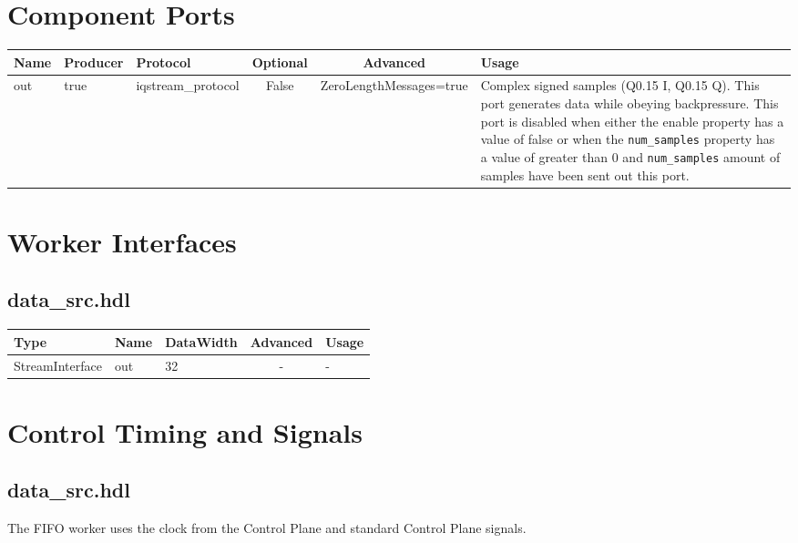 \documentclass{article}
\def\comp{temp}
\def\comp{data\_src}
\begin{document}
\begin{landscape}
	\section*{Component Ports}
	\begin{scriptsize}
\begin{tabular}{|M{2cm}|M{1.5cm}|M{4cm}|c|c|M{9cm}|}
\hline
{}
Name & Producer & Protocol & Optional & Advanced & Usage
\\
\hline
out & true & iqstream\_protocol& False & ZeroLengthMessages=true & Complex signed samples (Q0.15 I, Q0.15 Q). This port generates data while obeying backpressure. This port is disabled when either the enable property has a value of false or when the \verb+num_samples+ property has a value of greater than 0 and \verb+num_samples+ amount of samples have been sent out this port.\\
\hline
\end{tabular}
	\end{scriptsize}

	\section*{Worker Interfaces}
	\subsection*{\comp.hdl}
	\begin{scriptsize}
\begin{tabular}{|M{2cm}|M{1.5cm}|M{4cm}|c|M{12cm}|}
\hline
{}
Type & Name & DataWidth & Advanced & Usage
\\
\hline
StreamInterface & out & 32 & - & -\\
\hline
\end{tabular}
	\end{scriptsize}
\end{landscape}

\section*{Control Timing and Signals}
\subsection*{\comp.hdl}
\begin{flushleft}
  The FIFO worker uses the clock from the Control Plane and standard Control Plane signals.
\end{flushleft}
\end{document}

